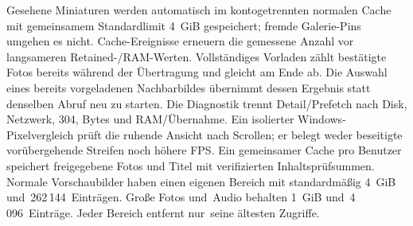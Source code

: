 \documentclass[11pt,a4paper]{article}
\begin{document}
Gesehene Miniaturen werden automatisch im kontogetrennten normalen Cache mit
gemeinsamem Standardlimit 4~GiB gespeichert; fremde Galerie-Pins umgehen es nicht.
Cache-Ereignisse erneuern die gemessene Anzahl vor langsameren Retained-/RAM-Werten.
Vollständiges Vorladen zählt bestätigte Fotos bereits während der Übertragung
und gleicht am Ende ab. Die Auswahl eines bereits vorgeladenen Nachbarbildes
übernimmt dessen Ergebnis statt denselben Abruf neu zu starten. Die Diagnostik
trennt Detail/Prefetch nach Disk, Netzwerk, 304, Bytes und RAM/Übernahme.
Ein isolierter Windows-Pixelvergleich prüft die ruhende Ansicht nach Scrollen;
er belegt weder beseitigte vorübergehende Streifen noch höhere FPS.
Ein gemeinsamer Cache pro Benutzer speichert freigegebene Fotos und Titel mit
verifizierten Inhaltsprüfsummen. Normale Vorschaubilder haben einen eigenen
Bereich mit standardmäßig 4~GiB und~262\,144~Einträgen. Große Fotos und~Audio behalten
1~GiB und~4\,096~Einträge. Jeder Bereich entfernt nur~seine ältesten Zugriffe.
\end{document}
